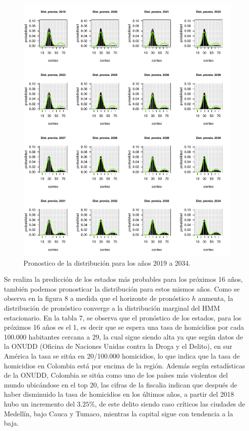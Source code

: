 \documentclass[a4paper]{article}\usepackage[]{graphicx}\usepackage[]{color}
\makeatletter
\def\maxwidth{ %
  \ifdim\Gin@nat@width>\linewidth
    \linewidth
  \else
    \Gin@nat@width
  \fi
}
\newenvironment{knitrout}{}{} %
\makeatother
\begin{document}
\begin{knitrout}
\color{fgcolor}\begin{figure}
\includegraphics[width=\maxwidth]{figure/unnamed-chunk-19-1} \caption[Pronostico de la distribución para los años 2019 a 2034]{Pronostico de la distribución para los años 2019 a 2034.}\label{fig:unnamed-chunk-19}
\end{figure}


\end{knitrout}

Se realiza la predicción de los estados más probables para los próximos 16 años, también podemos pronosticar la distribución para estos mismos años. Como se observa en la figura 8 a medida que el horizonte de pronóstico $h$ aumenta, la distribución de pronóstico converge a la distribución marginal del HMM estacionario. En la tabla 7, se observa que el pronóstico de los estados, para los próximos 16 años es el 1, es decir que se espera una tasa de homicidios por cada 100.000 habitantes cercana a 29, la cual sigue siendo alta ya que según datos de la ONUDD (Oficina de Naciones Unidas contra la Droga y el Delito), en sur América la tasa se sitúa en 20/100.000 homicidios, lo que indica que la tasa de homicidios en  Colombia está por encima de la región. Además según estadísticas de la ONUDD, Colombia se sitúa como uno de los países más violentos del mundo ubicándose en el top 20, las cifras de la fiscalia indican que después de haber disminuido la tasa de homicidios en los últimos años, a partir del 2018 hubo un incremento del $3.25 \%$, de este delito siendo caso críticos las ciudades de Medellín, bajo Cauca y Tumaco, mientras la capital sigue con tendencia a la baja.
\end{document}
